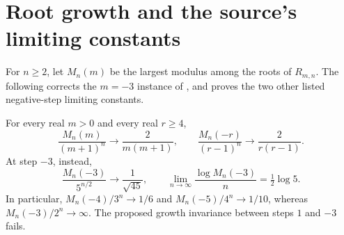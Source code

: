 \section{Root growth and the source's limiting constants}
For $n\geq2$, let $M_n(m)$ be the largest modulus among the roots
of $R_{m,n}$. The following corrects the $m=-3$ instance of
\cite[p.~1, Theorem~1; pp.~2--3, tables]{chen}, and proves the
two other listed negative-step limiting constants.

\begin{theorem}\label{thm:growth}
For every real $m>0$ and every real $r\geq4$,
\[
 \frac{M_n(m)}{(m+1)^n}\longrightarrow\frac{2}{m(m+1)},\qquad
 \frac{M_n(-r)}{(r-1)^n}\longrightarrow\frac{2}{r(r-1)}.
\]
At step $-3$, instead,
\[
 \frac{M_n(-3)}{5^{n/2}}\longrightarrow\frac1{\sqrt{45}},\qquad
 \lim_{n\to\infty}\frac{\log M_n(-3)}n=\tfrac12\log5.
\]
In particular, $M_n(-4)/3^n\to1/6$ and
$M_n(-5)/4^n\to1/10$, whereas $M_n(-3)/2^n\to\infty$.
The proposed growth invariance between steps $1$ and $-3$ fails.
\end{theorem}
